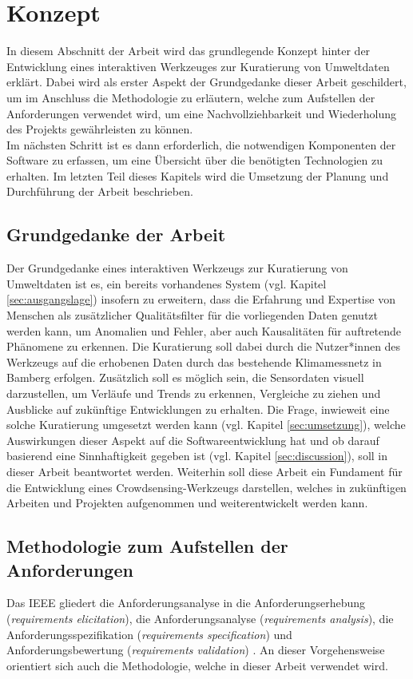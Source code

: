 \chapter{Konzept} %
In diesem Abschnitt der Arbeit wird das grundlegende Konzept hinter der Entwicklung eines interaktiven Werkzeuges zur Kuratierung von Umweltdaten erklärt. Dabei wird als erster Aspekt der Grundgedanke dieser Arbeit geschildert, um im Anschluss die Methodologie zu erläutern, welche zum Aufstellen der Anforderungen verwendet wird, um eine Nachvollziehbarkeit und Wiederholung des Projekts gewährleisten zu können. \\ Im nächsten Schritt ist es dann erforderlich, die notwendigen Komponenten der Software zu erfassen, um eine Übersicht über die benötigten Technologien zu erhalten. Im letzten Teil dieses Kapitels wird die Umsetzung der Planung und Durchführung der Arbeit beschrieben.

\section{Grundgedanke der Arbeit}
Der Grundgedanke eines interaktiven Werkzeugs zur Kuratierung von Umweltdaten ist es, ein bereits vorhandenes System (vgl. Kapitel \ref{sec:ausgangslage}) insofern zu erweitern, dass die Erfahrung und Expertise von Menschen als zusätzlicher Qualitätsfilter für die vorliegenden Daten genutzt werden kann, um Anomalien und Fehler, aber auch Kausalitäten für auftretende Phänomene zu erkennen. Die Kuratierung soll dabei durch die Nutzer*innen des Werkzeugs auf die erhobenen Daten durch das bestehende Klimamessnetz in Bamberg erfolgen. Zusätzlich soll es möglich sein, die Sensordaten visuell darzustellen, um Verläufe und Trends zu erkennen, Vergleiche zu ziehen und Ausblicke auf zukünftige Entwicklungen zu erhalten. Die Frage, inwieweit eine solche Kuratierung umgesetzt werden kann (vgl. Kapitel \ref{sec:umsetzung}), welche Auswirkungen dieser Aspekt auf die Softwareentwicklung hat und ob darauf basierend eine Sinnhaftigkeit gegeben ist (vgl. Kapitel \ref{sec:discussion}), soll in dieser Arbeit beantwortet werden. Weiterhin soll diese Arbeit ein Fundament für die Entwicklung eines Crowdsensing-Werkzeugs darstellen, welches in zukünftigen Arbeiten und Projekten aufgenommen und weiterentwickelt werden kann. 

\section{Methodologie zum Aufstellen der Anforderungen}
\label{sec:methodologyrequirements}
Das \ac{IEEE} gliedert die Anforderungsanalyse in die Anforderungserhebung (\textit{requirements elicitation}), die Anforderungsanalyse (\textit{requirements analysis}), die Anforderungsspezifikation (\textit{requirements specification}) und Anforderungsbewertung (\textit{requirements validation}) \cite{ieee2004}. An dieser Vorgehensweise orientiert sich auch die Methodologie, welche in dieser Arbeit verwendet wird.

